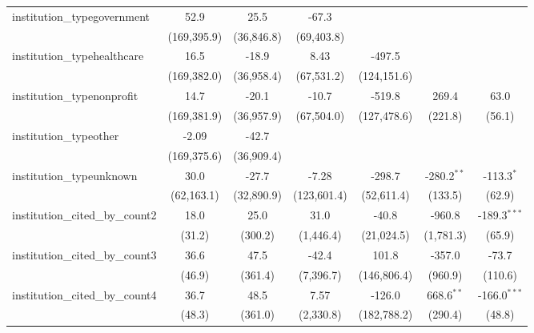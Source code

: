 \begin{tabular}{lcccccc}
   institution\_typegovernment           & 52.9         & 25.5         & -67.3        &              &                &   \\   
                                         & (169,395.9)  & (36,846.8)   & (69,403.8)   &              &                &   \\   
   institution\_typehealthcare           & 16.5         & -18.9        & 8.43         & -497.5       &                &   \\   
                                         & (169,382.0)  & (36,958.4)   & (67,531.2)   & (124,151.6)  &                &   \\   
   institution\_typenonprofit            & 14.7         & -20.1        & -10.7        & -519.8       & 269.4          & 63.0\\   
                                         & (169,381.9)  & (36,957.9)   & (67,504.0)   & (127,478.6)  & (221.8)        & (56.1)\\   
   institution\_typeother                & -2.09        & -42.7        &              &              &                &   \\   
                                         & (169,375.6)  & (36,909.4)   &              &              &                &   \\   
   institution\_typeunknown              & 30.0         & -27.7        & -7.28        & -298.7       & -280.2$^{**}$  & -113.3$^{*}$\\   
                                         & (62,163.1)   & (32,890.9)   & (123,601.4)  & (52,611.4)   & (133.5)        & (62.9)\\   
   institution\_cited\_by\_count2        & 18.0         & 25.0         & 31.0         & -40.8        & -960.8         & -189.3$^{***}$\\   
                                         & (31.2)       & (300.2)      & (1,446.4)    & (21,024.5)   & (1,781.3)      & (65.9)\\   
   institution\_cited\_by\_count3        & 36.6         & 47.5         & -42.4        & 101.8        & -357.0         & -73.7\\   
                                         & (46.9)       & (361.4)      & (7,396.7)    & (146,806.4)  & (960.9)        & (110.6)\\   
   institution\_cited\_by\_count4        & 36.7         & 48.5         & 7.57         & -126.0       & 668.6$^{**}$   & -166.0$^{***}$\\   
                                         & (48.3)       & (361.0)      & (2,330.8)    & (182,788.2)  & (290.4)        & (48.8)\\   

\end{tabular}
